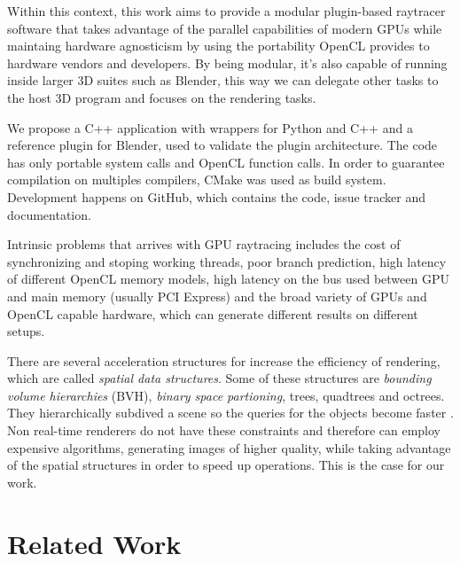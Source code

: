 \documentclass[a4paper]{sbgames}               %
\begin{document}
Within this context, this work aims to provide a modular plugin-based
raytracer software that takes advantage of the parallel capabilities
of modern GPUs while maintaing hardware agnosticism by using the
portability OpenCL provides to hardware vendors and developers. By
being modular, it's also capable of running inside larger 3D suites
such as Blender, this way we can delegate other tasks to the host 3D
program and focuses on the rendering tasks.

We propose a C++ application with wrappers for
Python %
and C++ and a reference plugin for Blender, used to validate the
plugin architecture. The code has only portable system calls and
OpenCL function calls. In order to guarantee compilation on multiples
compilers, CMake was used as build system. Development happens on
GitHub, which contains the code, issue tracker and
documentation.

Intrinsic problems that arrives with GPU raytracing includes the cost
of synchronizing and stoping working threads, poor branch prediction,
high latency of different OpenCL memory models, high latency on the
bus used between GPU and main memory (usually PCI Express) and the
broad variety of GPUs and OpenCL capable hardware, which can generate
different results on different setups.

There are several acceleration structures for increase the efficiency
of rendering, which are called \emph{spatial data structures}. Some of
these structures are \emph{bounding volume hierarchies} (BVH),
\emph{binary space partioning}, trees, quadtrees and octrees. They
hierarchically subdived a scene so the queries for the objects become
faster \cite[Chapter~14]{akenine-moller:2008}. Non real-time renderers
do not have these constraints and therefore can employ expensive
algorithms, generating images of higher quality, while taking
advantage of the spatial structures in order to speed up
operations. This is the case for our work.

\section{Related Work}
\label{sec:related-work}
\end{document}
